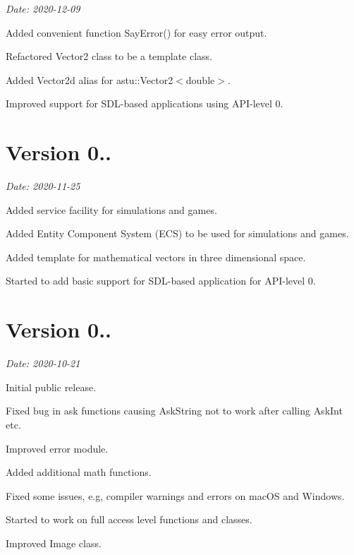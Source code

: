 {\itshape Date\+: 2020-\/12-\/09}


\begin{DoxyItemize}
\item Added convenient function {\ttfamily Say\+Error()} for easy error output.
\item Refactored {\ttfamily Vector2} class to be a template class.
\item Added {\ttfamily Vector2d} alias for {\ttfamily astu\+::\+Vector2$<$double$>$}.
\item Improved support for S\+D\+L-\/based applications using A\+P\+I-\/level 0.
\end{DoxyItemize}

\section*{Version 0..}

{\itshape Date\+: 2020-\/11-\/25}


\begin{DoxyItemize}
\item Added service facility for simulations and games.
\item Added Entity Component System (E\+CS) to be used for simulations and games.
\item Added template for mathematical vectors in three dimensional space.
\item Started to add basic support for S\+D\+L-\/based application for A\+P\+I-\/level 0.
\end{DoxyItemize}

\section*{Version 0..}

{\itshape Date\+: 2020-\/10-\/21}


\begin{DoxyItemize}
\item Initial public release.
\item Fixed bug in ask functions causing {\ttfamily Ask\+String} not to work after calling {\ttfamily Ask\+Int} etc.
\item Improved error module.
\item Added additional math functions.
\item Fixed some issues, e.\+g, compiler warnings and errors on mac\+OS and Windows.
\item Started to work on full access level functions and classes.
\item Improved Image class.
\end{DoxyItemize}

